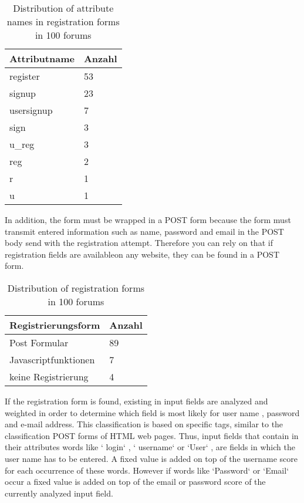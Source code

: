 \begin{table}[h!]
\centering 
\begin{tabular}{ | p{3cm} | p{3cm}|} \hline
Attributname & Anzahl \\ \hline
register & 53 \\ \hline
signup & 23 \\ \hline
usersignup & 7 \\ \hline
sign & 3 \\ \hline
u\_reg & 3 \\ \hline
reg & 2 \\ \hline
r & 1 \\ \hline
u & 1 \\ \hline
\end{tabular}
\caption{Distribution of attribute names in registration forms in 100 forums}
\end{table}

In addition, the form must be wrapped in a POST form because the form must transmit entered information such as name, password and email in the POST body send with the registration attempt. Therefore you can rely on that if registration fields are availableon any website, they can be found in a POST form.

\begin{table}[h!]
\centering 
\begin{tabular}{ | p{5cm} | p{3cm}|} \hline
Registrierungsform & Anzahl \\ \hline
Post Formular & 89 \\ \hline
Javascriptfunktionen & 7 \\ \hline
keine Registrierung & 4 \\ \hline
\end{tabular}
\caption{Distribution of registration forms in 100 forums}
\end{table}

If the registration form is found, existing in input fields are analyzed and weighted in order to determine which field is most likely for user name , password and e-mail address. This classification is based on specific tags, similar to the classification POST forms of HTML web pages.
Thus, input fields that contain in their attributes words like ` login` , ` username` or `User` , are fields in which the user name has to be entered. A fixed value is added on top of the username score  for each occurrence of these words. However if words like `Password` or `Email` occur a fixed value is added on top of the email or password score of the currently analyzed input field.

